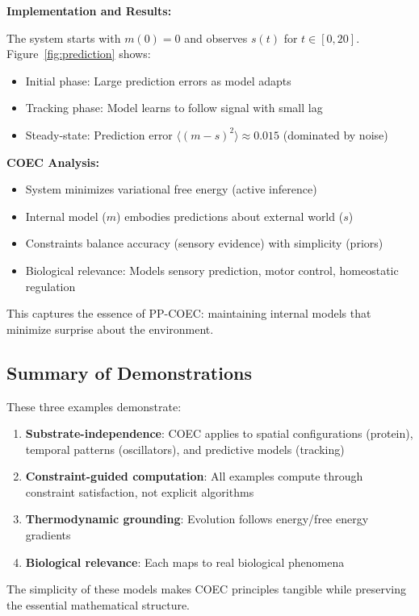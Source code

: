 \documentclass[11pt]{article}
\begin{document}
\textbf{Implementation and Results:}

The system starts with $m(0) = 0$ and observes $s(t)$ for $t \in [0, 20]$. Figure~\ref{fig:prediction} shows:

\begin{itemize}
\item Initial phase: Large prediction errors as model adapts
\item Tracking phase: Model learns to follow signal with small lag
\item Steady-state: Prediction error $\langle (m - s)^2 \rangle \approx 0.015$ (dominated by noise)
\end{itemize}

\textbf{COEC Analysis:}
\begin{itemize}
\item System minimizes variational free energy (active inference)
\item Internal model ($m$) embodies predictions about external world ($s$)
\item Constraints balance accuracy (sensory evidence) with simplicity (priors)
\item Biological relevance: Models sensory prediction, motor control, homeostatic regulation
\end{itemize}

This captures the essence of PP-COEC: maintaining internal models that minimize surprise about the environment.

\subsection{Summary of Demonstrations}

These three examples demonstrate:
\begin{enumerate}
\item \textbf{Substrate-independence}: COEC applies to spatial configurations (protein), temporal patterns (oscillators), and predictive models (tracking)
\item \textbf{Constraint-guided computation}: All examples compute through constraint satisfaction, not explicit algorithms
\item \textbf{Thermodynamic grounding}: Evolution follows energy/free energy gradients
\item \textbf{Biological relevance}: Each maps to real biological phenomena
\end{enumerate}

The simplicity of these models makes COEC principles tangible while preserving the essential mathematical structure.
\end{document}
